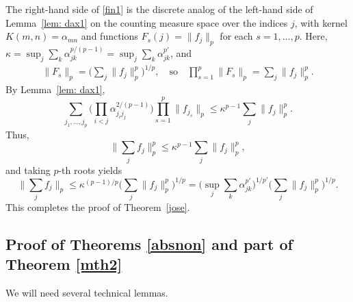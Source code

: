 \documentclass[11pt]{article}
\theoremstyle{definition}
\newcommand{\1}{\mathbf{1}}
\begin{document}
The right-hand side of \eqref{fin1} is the discrete analog of the left-hand side of Lemma~\ref{lem: dax1} on the counting measure space over the indices $j$, with kernel $K(m, n) = \alpha_{m n}$ and functions $F_s(j) = \| f_j \|_p$ for each $s = 1, \dots, p$.
Here, $\kappa = \sup_j \sum_k \alpha_{j k}^{p/(p-1)} = \sup_j \sum_k \alpha_{j k}^{p'}$, and
\begin{align*}
\| F_s \|_p = \Big( \sum_j \| f_j \|_p^p \Big)^{1/p}, \quad \text{so} \quad \prod_{s=1}^p \| F_s \|_p = \sum_j \| f_j \|_p^p.  \end{align*}
By Lemma~\ref{lem: dax1},
$$
\sum_{j_1, \dots, j_p} \Big( \prod_{i < j} \alpha_{j_i j_j}^{2/(p-1)} \Big) \prod_{s=1}^p \| f_{j_s} \|_p \leq \kappa^{p-1} \sum_j \| f_j \|_p^p.
$$
Thus,
$$\Big\| \sum_j f_j \Big\|_p^p \leq \kappa^{p-1} \sum_j \| f_j \|_p^p,$$
and taking $p$-th roots yields
$$
\Big\| \sum_j f_j \Big\|_p \leq \kappa^{(p-1)/p} \Big( \sum_j \| f_j \|_p^p \Big)^{1/p} = \Big( \sup_j \sum_k \alpha_{j k}^{p'} \Big)^{1/p'} \Big( \sum_j \| f_j \|_p^p \Big)^{1/p}.
$$
This completes the proof of Theorem~\ref{jose}.






\subsection{Proof of  Theorems \ref{absnon} and part of Theorem \ref{mth2}}\label{lieb1}
We will need several technical lemmas.
\end{document}
